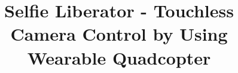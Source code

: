 \documentclass{sig-alternate-ipsn13}
\begin{document}
\title{Selfie Liberator - Touchless Camera Control by Using Wearable Quadcopter}
%
%
%
%
%
\end{document}
